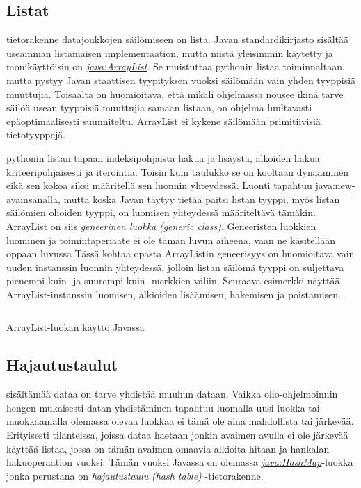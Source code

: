 \documentclass{tufte-book}
\newcommand{\eng}[1]{\textit{(#1)}}
\newcommand{\new}[1]{\textit{\gls{#1}}}
\newcommand{\neweng}[2]{\new{#1} \eng{#2}}
\newcommand{\java}[1]{\underline{\gls{java:#1}}}
\newcommand{\newjava}[1]{\textit{\java{#1}}}
\newcommand{\code}[3]{
\begin{listing}
    \inputminted{java}{OhjelmointiopasEsimerkit/src/#1/#2.java}
    \caption{#3}
    \label{Java-#1-#2}
\end{listing}
}
\begin{document}
\subsection{Listat}
\label{listat}

 tietorakenne datajoukkojen säilömiseen on lista. Javan
standardikirjasto sisältää useamman listamaisen implementaation, mutta niistä yleisimmin käytetty 
ja monikäyttöisin on \newjava{ArrayList}. Se muistuttaa pythonin listaa toiminnaltaan, mutta
pystyy Javan staattisen tyypityksen vuoksi säilömään vain yhden tyyppisiä muuttujia. Toisaalta on
huomioitava, että mikäli ohjelmassa nousee ikinä tarve säilöä usean tyyppisiä muuttujia samaan
listaan, on ohjelma luultavasti epäoptimaalisesti suunniteltu. ArrayList ei kykene säilömään
primitiivisiä tietotyyppejä.

\newthought{\java{ArrayList} tukee} pythonin listan tapaan indeksipohjaista hakua ja lisäystä,
alkoiden hakua kriteeripohjaisesti ja iterointia. Toisin kuin taulukko se on kooltaan dynaaminen
eikä sen kokoa siksi määritellä sen luonnin yhteydessä. Luonti tapahtuu \java{new}-avainsanalla,
mutta koska Javan täytyy tietää paitsi listan tyyppi, myös listan säilömien olioiden tyyppi, on
luomisen yhteydessä määriteltävä tämäkin. ArrayList on siis \neweng{geneerinen luokka}{generic
class}. Geneeristen luokkien luominen ja toimintaperiaate ei ole tämän luvun aiheena, vaan ne
käsitellään oppaan luvussa  Tässä kohtaa opasta ArrayListin geneerisyys on
huomioitava vain uuden instanssin luonnin yhteydessä, jolloin listan säilömä tyyppi on suljettava
pienempi kuin- ja suurempi kuin -merkkien väliin. Seuraava esimerkki näyttää ArrayList-instanssin
luomisen, alkioiden lisäämisen, hakemisen ja poistamisen.

\code{week3/basicexamples}{ArrayListUsage}{ArrayList-luokan käyttö Javassa}

\subsection{Hajautustaulut}
\label{HashMap}

 sisältämää dataa on tarve yhdistää muuhun dataan. Vaikka
olio-ohjelmoinnin hengen mukaisesti datan yhdistäminen tapahtuu luomalla uusi luokka tai
muokkaamalla olemassa olevaa luokkaa ei tämä ole aina mahdollista tai järkevää. Erityisesti
tilanteissa, joissa dataa haetaan jonkin avaimen avulla ei ole järkevää käyttää listaa, jossa on
tämän avaimen omaavia alkioita hitaan ja hankalan hakuoperaation vuoksi. Tämän vuoksi Javassa
on olemassa \newjava{HashMap}-luokka jonka perustana on \neweng{hajautustaulu}{hash table}
-tietorakenne.
\end{document}
